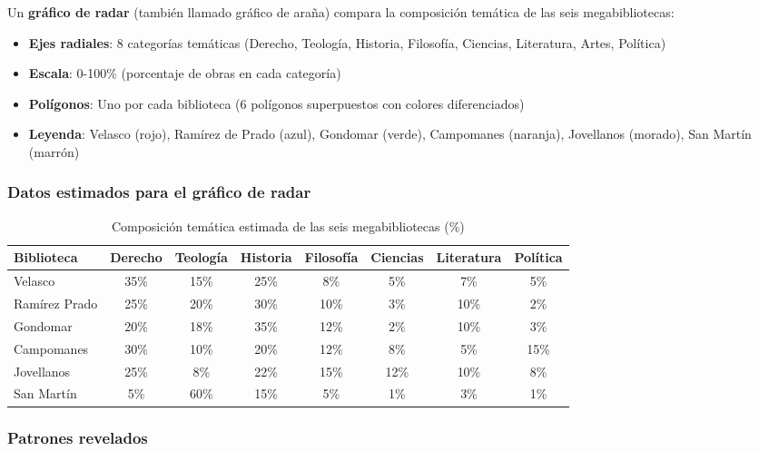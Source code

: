 \documentclass[11pt,a4paper]{article}
\begin{document}
Un \textbf{gráfico de radar} (también llamado gráfico de araña) compara la composición temática de las seis megabibliotecas:

\begin{itemize}
\item \textbf{Ejes radiales}: 8 categorías temáticas (Derecho, Teología, Historia, Filosofía, Ciencias, Literatura, Artes, Política)
\item \textbf{Escala}: 0-100\% (porcentaje de obras en cada categoría)
\item \textbf{Polígonos}: Uno por cada biblioteca (6 polígonos superpuestos con colores diferenciados)
\item \textbf{Leyenda}: Velasco (rojo), Ramírez de Prado (azul), Gondomar (verde), Campomanes (naranja), Jovellanos (morado), San Martín (marrón)
\end{itemize}

\subsubsection{Datos estimados para el gráfico de radar}

\begin{table}[h]
\centering
\small
\begin{tabular}{lccccccc}
\toprule
\textbf{Biblioteca} & \textbf{Derecho} & \textbf{Teología} & \textbf{Historia} & \textbf{Filosofía} & \textbf{Ciencias} & \textbf{Literatura} & \textbf{Política} \\
\midrule
Velasco & 35\% & 15\% & 25\% & 8\% & 5\% & 7\% & 5\% \\
Ramírez Prado & 25\% & 20\% & 30\% & 10\% & 3\% & 10\% & 2\% \\
Gondomar & 20\% & 18\% & 35\% & 12\% & 2\% & 10\% & 3\% \\
Campomanes & 30\% & 10\% & 20\% & 12\% & 8\% & 5\% & 15\% \\
Jovellanos & 25\% & 8\% & 22\% & 15\% & 12\% & 10\% & 8\% \\
San Martín & 5\% & 60\% & 15\% & 5\% & 1\% & 3\% & 1\% \\
\bottomrule
\end{tabular}
\caption{Composición temática estimada de las seis megabibliotecas (\%)}
\end{table}

\subsubsection{Patrones revelados}
\end{document}

